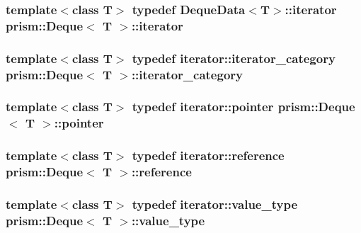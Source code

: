 \subsubsection[{\texorpdfstring{iterator}{iterator}}]{\setlength{\rightskip}{0pt plus 5cm}template$<$class T$>$ typedef Deque\+Data$<$T$>$\+::{\bf iterator} {\bf prism\+::\+Deque}$<$ T $>$\+::{\bf iterator}}\hypertarget{classprism_1_1_deque_af6fbdfa6e826f7f71b29f4d3cfb72ed1}{}\label{classprism_1_1_deque_af6fbdfa6e826f7f71b29f4d3cfb72ed1}
\subsubsection[{\texorpdfstring{iterator\+\_\+category}{iterator_category}}]{\setlength{\rightskip}{0pt plus 5cm}template$<$class T$>$ typedef iterator\+::iterator\+\_\+category {\bf prism\+::\+Deque}$<$ T $>$\+::{\bf iterator\+\_\+category}}\hypertarget{classprism_1_1_deque_a5a8e5c9e68bc92b45fcf5b1dcae7418b}{}\label{classprism_1_1_deque_a5a8e5c9e68bc92b45fcf5b1dcae7418b}
\subsubsection[{\texorpdfstring{pointer}{pointer}}]{\setlength{\rightskip}{0pt plus 5cm}template$<$class T$>$ typedef iterator\+::pointer {\bf prism\+::\+Deque}$<$ T $>$\+::{\bf pointer}}\hypertarget{classprism_1_1_deque_a9cff677f1cdffd6f9900a84fd0fa7b17}{}\label{classprism_1_1_deque_a9cff677f1cdffd6f9900a84fd0fa7b17}
\subsubsection[{\texorpdfstring{reference}{reference}}]{\setlength{\rightskip}{0pt plus 5cm}template$<$class T$>$ typedef iterator\+::reference {\bf prism\+::\+Deque}$<$ T $>$\+::{\bf reference}}\hypertarget{classprism_1_1_deque_a93d8792e719ca205ce1b9ed5d8207c1d}{}\label{classprism_1_1_deque_a93d8792e719ca205ce1b9ed5d8207c1d}
\subsubsection[{\texorpdfstring{value\+\_\+type}{value_type}}]{\setlength{\rightskip}{0pt plus 5cm}template$<$class T$>$ typedef iterator\+::value\+\_\+type {\bf prism\+::\+Deque}$<$ T $>$\+::{\bf value\+\_\+type}}\hypertarget{classprism_1_1_deque_ab14234d70c36a687014d59a5569863c7}{}\label{classprism_1_1_deque_ab14234d70c36a687014d59a5569863c7}


